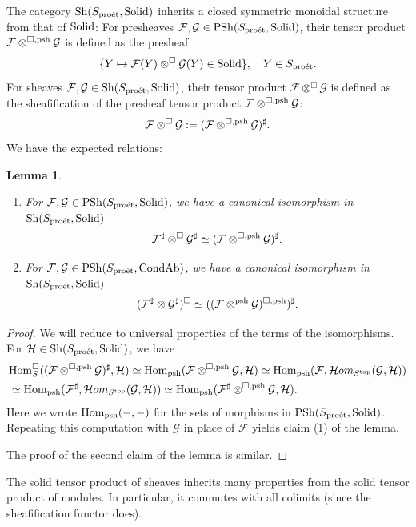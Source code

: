 \documentclass[10pt]{amsart}
\let\cal\mathcal
\newtheorem{lemma}[equation]{Lemma}
\theoremstyle{definition}
\theoremstyle{remark}
\newcommand{\proeet}{\operatorname{pro\acute{e}t} }
\newcommand{\Hom}{{\rm{Hom}} }
\newcommand{\Hhom}{{\cal Hom}}
\newcommand{\sff}{{\mathcal{F}}}
\newcommand{\sh}{{\mathcal{H}}}
\newcommand{\sg}{{\mathcal{G}}}
\numberwithin{equation}{section}
\numberwithin{equation}{section}
\begin{document}
 
    The category $ {\rm Sh}(S_{\proeet},{\rm Solid})$ inherits
 a closed symmetric monoidal structure from that of ${\rm Solid}$:  For  presheaves $\sff,\sg\in {\rm PSh}(S_{\proeet},{\rm Solid})$,  their tensor product  $\sff\otimes^{\Box, {\rm psh}} \sg$ is defined as  the presheaf 
$$
\{Y\mapsto \sff(Y)\otimes^{\Box} \sg(Y)\in {\rm Solid}\},\quad Y\in S_{\proeet}. 
$$
For  sheaves $\sff,\sg\in {\rm Sh}(S_{\proeet},{\rm Solid})$,  their tensor product  $\sff\otimes^{\Box} \sg$ is defined as the sheafification of the presheaf tensor product $\sff\otimes^{\Box, {\rm psh}} \sg$: 
$$\sff\otimes^{\Box} \sg:=(\sff\otimes^{\Box, {\rm psh}} \sg)^{\sharp}.
$$
We have the expected relations: 
\begin{lemma}\label{tensor} 
\begin{enumerate}
\item For $\sff,\sg \in  {\rm PSh}(S_{\proeet},{\rm Solid})$,  we have a canonical isomorphism in ${\rm Sh}(S_{\proeet},{\rm Solid})$
$$\sff^{\sharp} \otimes^{\Box} \sg^{\sharp}\simeq  (\sff \otimes^{\Box,{\rm psh}}\sg)^{\sharp}.$$
\item  For $\sff,\sg \in  {\rm PSh}(S_{\proeet},{\rm CondAb})$,  we have a canonical isomorphism in ${\rm Sh}(S_{\proeet},{\rm Solid})$
$$(\sff^{\sharp} \otimes\sg^{\sharp})^{\Box}\simeq  ((\sff \otimes^{\rm psh}\sg)^{\Box,{\rm psh}})^{\sharp}.$$
\end{enumerate}
\end{lemma}
\begin{proof} We will reduce to universal properties of the terms of the isomorphisms. 
For $\sh \in {\rm Sh}(S_{\proeet},{\rm Solid})$, we have 
\begin{align*}
 & \Hom^{\Box}_{S}((\sff\otimes^{\Box,{\rm psh}}\sg)^{\sharp},\sh)\simeq \Hom_{\rm psh}(\sff \otimes^{\Box,{\rm psh}}\sg,\sh)\simeq 
 \Hom_{\rm psh}(\sff,\Hhom_{S^{\rm top}}(\sg,\sh))\\
  & \simeq  \Hom_{\rm psh}(\sff^\sharp,\Hhom_{S^{\rm top}}(\sg,\sh))\simeq  \Hom_{\rm psh}(\sff^\sharp\otimes^{\Box,{\rm psh}}\sg,\sh).
\end{align*}
Here we wrote  $\Hom_{\rm psh}(-,-) $ for the sets of morphisms in  ${\rm PSh}(S_{\proeet},{\rm Solid})$. 
Repeating this computation with $\sg$ in place of $\sff$ yields claim (1) of the lemma.

 The proof of the second   claim of the lemma is similar. 
\end{proof}
The solid tensor product of sheaves  inherits many properties from the solid tensor product of modules. In particular, it commutes with all colimits (since the sheafification functor does).
\end{document}

